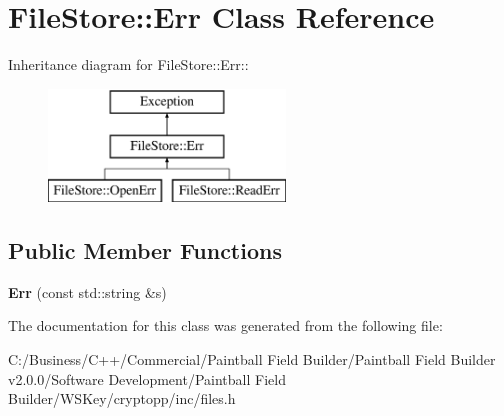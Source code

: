 \hypertarget{class_file_store_1_1_err}{
\section{FileStore::Err Class Reference}
\label{class_file_store_1_1_err}
}
Inheritance diagram for FileStore::Err::\begin{figure}[H]
\begin{center}
\leavevmode
\includegraphics[height=3cm]{class_file_store_1_1_err}
\end{center}
\end{figure}
\subsection*{Public Member Functions}
\begin{DoxyCompactItemize}
\item 
\hypertarget{class_file_store_1_1_err_aad7a4b5c0e782ec455dcb813fbd2c3b5}{
{\bfseries Err} (const std::string \&s)}
\label{class_file_store_1_1_err_aad7a4b5c0e782ec455dcb813fbd2c3b5}

\end{DoxyCompactItemize}


The documentation for this class was generated from the following file:\begin{DoxyCompactItemize}
\item 
C:/Business/C++/Commercial/Paintball Field Builder/Paintball Field Builder v2.0.0/Software Development/Paintball Field Builder/WSKey/cryptopp/inc/files.h\end{DoxyCompactItemize}
